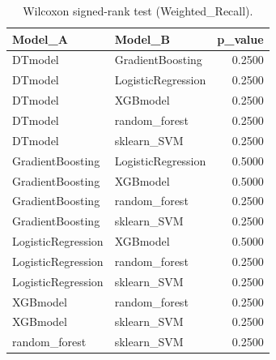 \begin{table}[t]
\centering
\begin{tabular}{llr}
\toprule
Model_A & Model_B & p_value \\
\midrule
DTmodel & GradientBoosting & 0.2500 \\
DTmodel & LogisticRegression & 0.2500 \\
DTmodel & XGBmodel & 0.2500 \\
DTmodel & random_forest & 0.2500 \\
DTmodel & sklearn_SVM & 0.2500 \\
GradientBoosting & LogisticRegression & 0.5000 \\
GradientBoosting & XGBmodel & 0.5000 \\
GradientBoosting & random_forest & 0.2500 \\
GradientBoosting & sklearn_SVM & 0.2500 \\
LogisticRegression & XGBmodel & 0.5000 \\
LogisticRegression & random_forest & 0.2500 \\
LogisticRegression & sklearn_SVM & 0.2500 \\
XGBmodel & random_forest & 0.2500 \\
XGBmodel & sklearn_SVM & 0.2500 \\
random_forest & sklearn_SVM & 0.2500 \\
\bottomrule
\end{tabular}
\caption{Wilcoxon signed-rank test (Weighted_Recall).}
\label{tab:wilcoxon_Weighted_Recall}
\end{table}